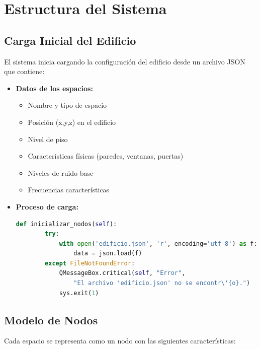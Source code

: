\documentclass[a4paper,12pt]{article}
\begin{document}
\section{Estructura del Sistema}
\subsection{Carga Inicial del Edificio}
El sistema inicia cargando la configuración del edificio desde un archivo JSON que contiene:

\begin{itemize}
    \item \textbf{Datos de los espacios:}
    \begin{itemize}
        \item Nombre y tipo de espacio
        \item Posición (x,y,z) en el edificio
        \item Nivel de piso
        \item Características físicas (paredes, ventanas, puertas)
        \item Niveles de ruido base
        \item Frecuencias características
    \end{itemize}
    
    \item \textbf{Proceso de carga:}
    \begin{lstlisting}[language=Python]
    def inicializar_nodos(self):
        try:
            with open('edificio.json', 'r', encoding='utf-8') as f:
                data = json.load(f)
        except FileNotFoundError:
            QMessageBox.critical(self, "Error", 
                "El archivo 'edificio.json' no se encontr\'{o}.")
            sys.exit(1)
    \end{lstlisting}
\end{itemize}

\subsection{Modelo de Nodos}
Cada espacio se representa como un nodo con las siguientes características:
\end{document}
